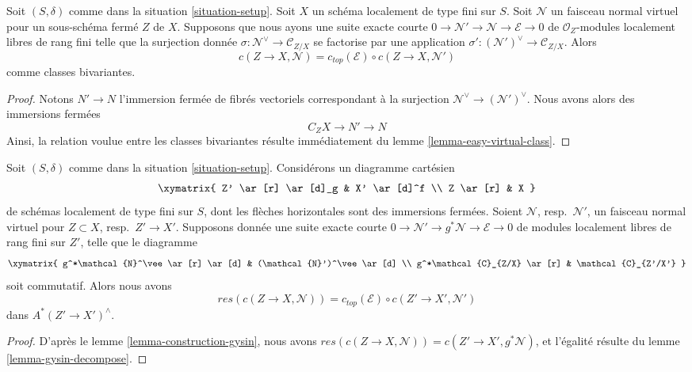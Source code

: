 \begin{lemma}
\label{lemma-gysin-decompose}
Soit $(S, \delta)$ comme dans la situation \ref{situation-setup}. Soit $X$ un schéma
localement de type fini sur $S$. Soit $\mathcal{N}$ un faisceau normal virtuel
pour un sous-schéma fermé $Z$ de $X$. Supposons que nous ayons une suite
exacte courte $0 \to \mathcal{N}' \to \mathcal{N} \to \mathcal{E} \to 0$
de $\mathcal{O}_Z$-modules localement libres de rang fini telle que la surjection donnée
$\sigma : \mathcal{N}^\vee \to \mathcal{C}_{Z/X}$ se factorise par une application
$\sigma' : (\mathcal{N}')^\vee \to \mathcal{C}_{Z/X}$.
Alors
$$
c(Z \to X, \mathcal{N}) = c_{top}(\mathcal{E}) \circ c(Z \to X, \mathcal{N}')
$$
comme classes bivariantes.
\end{lemma}

\begin{proof}
Notons $N' \to N$ l'immersion fermée de fibrés vectoriels correspondant
à la surjection $\mathcal{N}^\vee \to (\mathcal{N}')^\vee$. Nous avons alors
des immersions fermées
$$
C_ZX \to N' \to N
$$
Ainsi, la relation voulue entre les classes bivariantes résulte
immédiatement du lemme \ref{lemma-easy-virtual-class}.
\end{proof}

\begin{lemma}
\label{lemma-gysin-excess}
Soit $(S, \delta)$ comme dans la situation \ref{situation-setup}. Considérons
un diagramme cartésien
$$
\xymatrix{
Z' \ar[r] \ar[d]_g & X' \ar[d]^f \\
Z \ar[r] & X
}
$$
de schémas localement de type fini sur $S$, dont les flèches horizontales
sont des immersions fermées. Soient $\mathcal{N}$, resp.\ $\mathcal{N}'$,
un faisceau normal virtuel pour $Z \subset X$, resp.\ $Z' \to X'$.
Supposons donnée une suite exacte courte
$0 \to \mathcal{N}' \to g^*\mathcal{N} \to \mathcal{E} \to 0$
de modules localement libres de rang fini sur $Z'$, telle que le diagramme
$$
\xymatrix{
g^*\mathcal{N}^\vee \ar[r] \ar[d] &
(\mathcal{N}')^\vee \ar[d] \\
g^*\mathcal{C}_{Z/X} \ar[r] &
\mathcal{C}_{Z'/X'}
}
$$
soit commutatif. Alors nous avons
$$
res(c(Z \to X, \mathcal{N})) =
c_{top}(\mathcal{E}) \circ c(Z' \to X', \mathcal{N}')
$$
dans $A^*(Z' \to X')^\wedge$.
\end{lemma}

\begin{proof}
D'après le lemme \ref{lemma-construction-gysin}, nous avons
$res(c(Z \to X, \mathcal{N})) = c(Z' \to X', g^*\mathcal{N})$,
et l'égalité résulte du lemme \ref{lemma-gysin-decompose}.
\end{proof}

